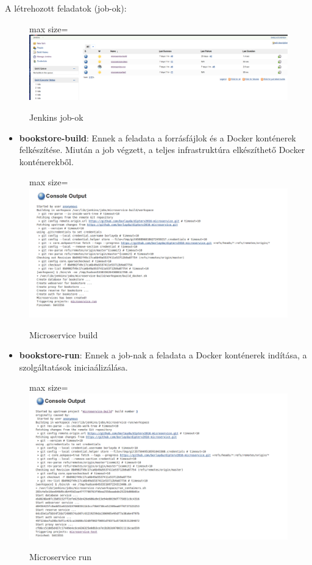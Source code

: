 \documentclass[11pt,magyar,a4paper,oneside,]{report}
\let\Oldincludegraphics\includegraphics
\renewcommand{\includegraphics}[1]{
\begin{adjustbox}{max size={\textwidth}{\textheight}}
    \Oldincludegraphics[scale=0.6]{#1}%
\end{adjustbox}
}
\begin{document}
A létrehozott feladatok (job-ok):

\begin{figure}[htbp]
\centering
\includegraphics{img/jenkins-jobs.png}
\caption{Jenkins job-ok}
\end{figure}

\begin{itemize}
\itemsep1pt\parskip0pt
\item
  \textbf{bookstore-build}: Ennek a feladata a forrásfájlok és a Docker
  konténerek felkészítése. Miután a job végzett, a teljes infrastruktúra
  elkészíthető Docker konténerekből.
\end{itemize}

\begin{figure}[htbp]
\centering
\includegraphics{img/jenkins-build.png}
\caption{Microservice build}
\end{figure}

\begin{itemize}
\itemsep1pt\parskip0pt
\item
  \textbf{bookstore-run}: Ennek a job-nak a feladata a Docker konténerek
  indítása, a szolgáltatások iniciaálizálása.
\end{itemize}

\begin{figure}[htbp]
\centering
\includegraphics{img/jenkins-run.png}
\caption{Microservice run}
\end{figure}
\end{document}
